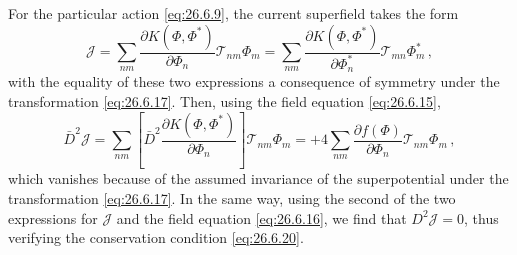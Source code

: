 For the particular action \eqref{eq:26.6.9}, the current superfield takes the
form
\begin{equation}
  \mathcal{J}
  =\sum_{nm}
    \frac{\partial K(\Phi,\Phi^*)}{\partial\Phi_n}
    \mathcal{T}_{nm}\Phi_m
  =\sum_{nm}
    \frac{\partial K(\Phi,\Phi^*)}{\partial\Phi_n^*}
    \mathcal{T}_{mn}\Phi_m^*\,,
  \tag{26.6.22}\label{eq:26.6.22}
\end{equation}
with the equality of these two expressions a consequence of symmetry under
the transformation \eqref{eq:26.6.17}. Then, using the field equation
\eqref{eq:26.6.15},
\begin{equation}
  \bar D^2\mathcal{J}
  =\sum_{nm}
    \left[
      \bar D^2
      \frac{\partial K(\Phi,\Phi^*)}{\partial\Phi_n}
    \right]
    \mathcal{T}_{nm}\Phi_m
  =+4\sum_{nm}
    \frac{\partial f(\Phi)}{\partial\Phi_n}
    \mathcal{T}_{nm}\Phi_m\,,
  \tag{26.6.23}\label{eq:26.6.23}
\end{equation}
which vanishes because of the assumed invariance of the superpotential under
the transformation \eqref{eq:26.6.17}. In the same way, using the second of
the two expressions for \(\mathcal{J}\) and the field equation
\eqref{eq:26.6.16}, we find that \(D^2\mathcal{J}=0\), thus verifying
the conservation condition \eqref{eq:26.6.20}.
